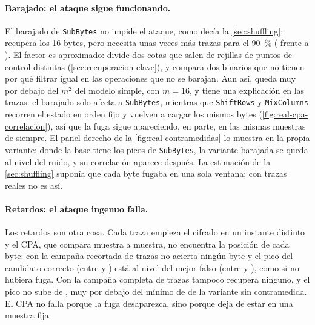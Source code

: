 \paragraph{Barajado: el ataque sigue funcionando.} El barajado de
\texttt{SubBytes} no impide el ataque, como decía la \cref{sec:shuffling}:
recupera los 16 bytes, pero necesita unas \realShuffleFactor{} veces más
trazas para el 90~\% (\realShuffleTracesNinety{} frente a
\realBaseTracesNinety). El factor es aproximado: divide dos cotas que salen de
rejillas de puntos de control distintas (\cref{sec:recuperacion-clave}), y
compara dos binarios que no tienen por qué filtrar igual en las operaciones
que no se barajan. Aun así, queda muy por debajo del $m^2$ del modelo simple,
con $m = 16$, y tiene una explicación en las trazas: el barajado solo afecta a
\texttt{SubBytes}, mientras que \texttt{ShiftRows} y \texttt{MixColumns}
recorren el estado en orden fijo y vuelven a cargar los mismos bytes
(\cref{fig:real-cpa-correlacion}), así que la fuga sigue apareciendo, en parte,
en las mismas muestras de siempre. El panel derecho de la
\cref{fig:real-contramedidas} lo muestra en la propia variante: donde la base
tiene los picos de \texttt{SubBytes}, la variante barajada se queda al nivel
del ruido, y su correlación aparece después. La estimación de la
\cref{sec:shuffling} suponía que cada byte fugaba en una sola ventana; con
trazas reales no es así.

\paragraph{Retardos: el ataque ingenuo falla.} Los retardos son otra cosa. Cada
traza empieza el cifrado en un instante distinto y el CPA, que compara muestra a
muestra, no encuentra la posición de cada byte: con la campaña recortada de
\realDelayTraces{} trazas no acierta ningún byte y el pico del candidato
correcto (entre \realDelayRhoMin{} y \realDelayRhoMax) está al nivel del mejor
falso (entre \realDelayRhoWrongMin{} y \realDelayRhoWrongMax), como si no
hubiera fuga. Con la campaña completa de \realDelayFullTraces{} trazas tampoco
recupera ninguno, y el pico no sube de \realDelayFullRho, muy por debajo del
mínimo de \realBaseRhoMin{} de la variante sin contramedida. El CPA no falla porque la fuga
desaparezca, sino porque deja de estar en una muestra fija.

